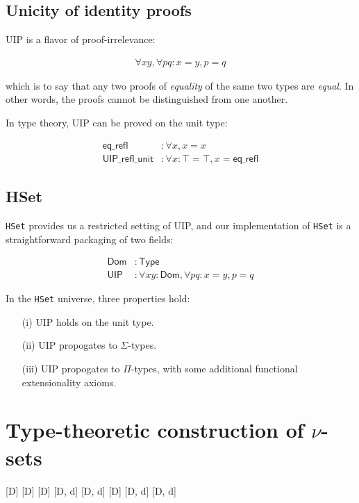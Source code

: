 \documentclass[10pt]{art}
\begin{document}
\subsection{Unicity of identity proofs}
UIP is a flavor of proof-irrelevance:

\begin{align*}
  \forall x y, \forall p q : x = y, p = q
\end{align*}

which is to say that any two proofs of \emph{equality} of the same two types are \emph{equal}. In other words, the proofs cannot be distinguished from one another.

In type theory, UIP can be proved on the unit type:

\begin{align*}
  \mathsf{eq\_refl}        & : \forall x, x = x                               \\
  \mathsf{UIP\_refl\_unit} & : \forall x : \top = \top, x = \mathsf{eq\_refl}
\end{align*}

\subsection{HSet}
\texttt{HSet} provides us a restricted setting of UIP, and our implementation of \texttt{HSet} is a straightforward packaging of two fields:

\begin{align*}
  \mathsf{Dom} & : \mathsf{Type}                                          \\
  \mathsf{UIP} & : \forall x y : \mathsf{Dom}, \forall p q : x = y, p = q
\end{align*}

In the \texttt{HSet} universe, three properties hold:

\begin{enumerate}
  \item[(i)] UIP holds on the unit type.
  \item[(ii)] UIP propogates to $\Sigma$-types.
  \item[(iii)] UIP propogates to $\Pi$-types, with some additional functional extensionality axioms.
\end{enumerate}

\section{Type-theoretic construction of \texorpdfstring{$\nu$}{nu}-sets}
%
[D]
[D]
[D]
[D, d]
[D, d]
[D]
[D, d]
[D, d]
\end{document}
